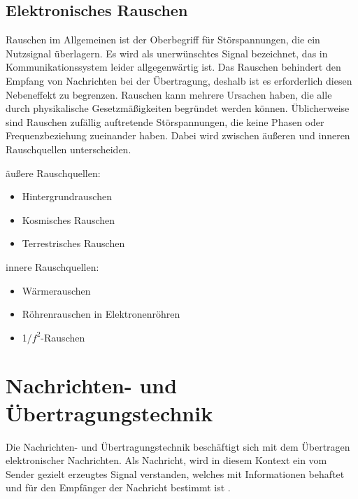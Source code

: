 \subsection{Elektronisches Rauschen}

Rauschen im Allgemeinen ist der Oberbegriff für Störspannungen, die ein Nutzsignal überlagern. Es wird als unerwünschtes Signal bezeichnet, das in Kommunikationssystem leider allgegenwärtig ist. Das Rauschen behindert den Empfang von Nachrichten bei der Übertragung, deshalb ist es erforderlich diesen Nebeneffekt zu begrenzen. Rauschen kann mehrere Ursachen haben, die alle durch physikalische Gesetzmäßigkeiten begründet werden können. Üblicherweise sind  Rauschen zufällig auftretende Störspannungen, die keine  Phasen oder Frequenzbeziehung zueinander haben. Dabei wird zwischen äußeren und inneren Rauschquellen unterscheiden.\newline


äußere Rauschquellen: 
\begin{itemize}
	\item Hintergrundrauschen
	\item Kosmisches Rauschen
	\item Terrestrisches Rauschen
\end{itemize}
innere Rauschquellen:
\begin{itemize}
	\item Wärmerauschen
	\item Röhrenrauschen in Elektronenröhren
	\item 1/$f^2$-Rauschen
\end{itemize}

\newpage
\section{Nachrichten- und Übertragungstechnik}
Die Nachrichten- und Übertragungstechnik beschäftigt sich mit dem Übertragen elektronischer Nachrichten. Als Nachricht, wird in diesem Kontext ein vom Sender gezielt erzeugtes Signal verstanden, welches mit Informationen behaftet und für den Empfänger der Nachricht bestimmt ist \cite[vgl. Werner, S. 3]{Werner:2006}.

